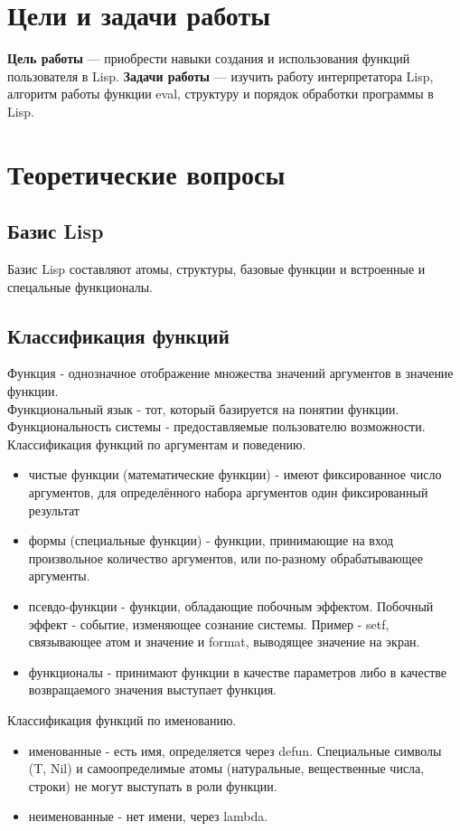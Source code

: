 \chapter{Цели и задачи работы}
\textbf{Цель работы} --- приобрести навыки создания и использования функций пользователя в Lisp.
\textbf{Задачи работы} --- изучить работу интерпретатора Lisp, алгоритм работы функции eval, структуру и порядок обработки программы в Lisp.

\chapter{Теоретические вопросы}
\section{Базис Lisp}
Базис Lisp составляют атомы, структуры, базовые функции и встроенные и спецальные функционалы.
\section{Классификация функций}
Функция - однозначное отображение множества значений аргументов в значение функции.\\
Функциональный язык - тот, который базируется на понятии функции.\\
Функциональность системы - предоставляемые пользователю возможности.\\

Классификация функций по аргументам и поведению.
\begin{itemize}
\item чистые функции (математические функции) - имеют фиксированное число аргументов, для определённого набора аргументов один фиксированный результат
\item формы (специальные функции) - функции, принимающие на вход произвольное количество аргументов, или по-разному обрабатывающее аргументы.
\item псевдо-функции - функции, обладающие побочным эффектом. Побочный эффект - событие, изменяющее сознание системы. Пример - setf, связывающее атом и значение и format, выводящее значение на экран.\item функционалы - принимают функции в качестве параметров либо в качестве возвращаемого значения выступает функция.
\end{itemize}

Классификация функций по именованию.
\begin{itemize}
\item именованные - есть имя, определяется через defun. Специальные символы (T, Nil) и самоопределимые атомы (натуральные, вещественные числа, строки) не могут выступать в роли функции.
\item неименованные - нет имени, через lambda.
\end{itemize}


